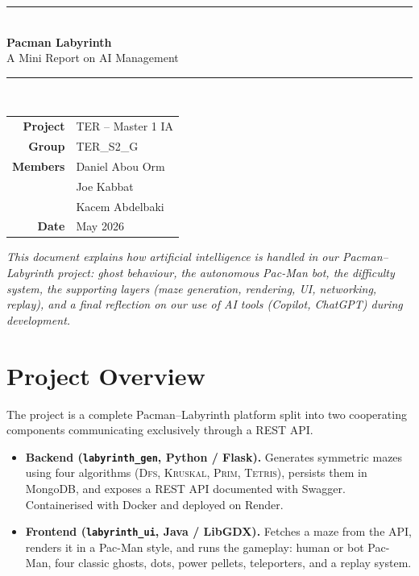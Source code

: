 \documentclass[11pt,a4paper]{article}
\begin{document}
\begin{center}
{\color{pmblue}\rule{\linewidth}{1.2pt}}\\[0.4em]
{\sffamily\Huge\bfseries\color{darkbg} Pacman Labyrinth}\\[0.3em]
{\sffamily\Large\color{pmblue} A Mini Report on AI Management}\\[0.4em]
{\color{pmblue}\rule{\linewidth}{0.6pt}}\\[1.2em]

\begin{tabular}{rl}
\textbf{Project} & TER -- Master 1 IA \\
\textbf{Group}   & TER\_S2\_G \\
\textbf{Members} & Daniel Abou Orm \\
                 & Joe Kabbat \\
                 & Kacem Abdelbaki \\
\textbf{Date}    & May 2026 \\
\end{tabular}

\vspace{0.8em}
\begin{infobox}[Scope]
\textit{This document explains how artificial intelligence is handled in
our Pacman--Labyrinth project: ghost behaviour, the autonomous Pac-Man
bot, the difficulty system, the supporting layers (maze generation,
rendering, UI, networking, replay), and a final reflection on our use of
AI \emph{tools} (Copilot, ChatGPT) during development.}
\end{infobox}
\end{center}

\section{Project Overview}

The project is a complete Pacman--Labyrinth platform split into two
cooperating components communicating exclusively through a REST API.

\begin{itemize}[leftmargin=1.3em,itemsep=2pt]
  \item \textbf{Backend (\texttt{labyrinth\_gen}, Python / Flask).}
        Generates symmetric mazes using four algorithms
        (\textsc{Dfs}, \textsc{Kruskal}, \textsc{Prim}, \textsc{Tetris}),
        persists them in MongoDB, and exposes a REST API documented with
        Swagger. Containerised with Docker and deployed on Render.
  \item \textbf{Frontend (\texttt{labyrinth\_ui}, Java / LibGDX).}
        Fetches a maze from the API, renders it in a Pac-Man style, and
        runs the gameplay: human or bot Pac-Man, four classic ghosts,
        dots, power pellets, teleporters, and a replay system.
\end{itemize}
\end{document}

